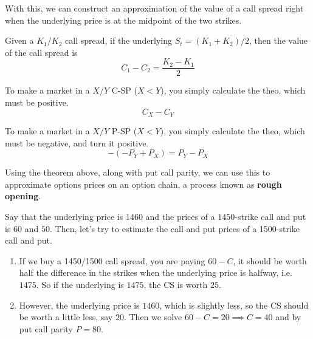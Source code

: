 \documentclass{article}
\begin{document}
    With this, we can construct an approximation of the value of a call spread right when the underlying price is at the midpoint of the two strikes. 

    \begin{corollary}
      Given a $K_1/K_2$ call spread, if the underlying $S_t = (K_1 + K_2)/2$, then the value of the call spread is 
      \begin{equation}
        C_1 - C_2  = \frac{K_2 - K_1}{2}
      \end{equation}
    \end{corollary}

    \begin{example}
      To make a market in a $X/Y$ C-SP ($X < Y$), you simply calculate the theo, which must be positive.
      \begin{equation}
        C_X - C_Y
      \end{equation}
    \end{example}

    \begin{example}
      To make a market in a $X/Y$ P-SP ($X < Y$), you simply calculate the theo, which must be negative, and turn it positive.
      \begin{equation}
        -(-P_Y + P_X) = P_Y - P_X
      \end{equation}
    \end{example}

    Using the theorem above, along with put call parity, we can use this to approximate options prices on an option chain, a process known as \textbf{rough opening}. 

    \begin{example}
       Say that the underlying price is $1460$ and the prices of a $1450$-strike call and put is $60$ and $50$. Then, let's try to estimate the call and put prices of a 1500-strike call and put.
       \begin{enumerate}
         \item If we buy a 1450/1500 call spread, you are paying $60 - C$, it should be worth half the difference in the strikes when the underlying price is halfway, i.e. $1475$. So if the underlying is $1475$, the CS is worth $25$.
         \item However, the underlying price is $1460$, which is slightly less, so the CS should be worth a little less, say $20$. Then we solve $60 - C = 20 \implies C = 40$ and by put call parity $P = 80$.
       \end{enumerate}
    \end{example}
\end{document}
